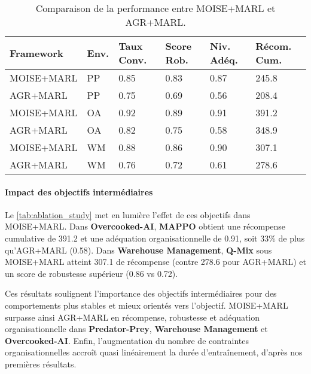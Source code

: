 \documentclass[francais,ROIA,Unicode,manuscript]{cedram}
\begin{document}
\begin{table}[h!]
    \centering
    \caption{Comparaison de la performance entre MOISE+MARL et AGR+MARL.}
    \label{tab:ablation_study}
    \footnotesize
    \renewcommand{\arraystretch}{1.1}
    \begin{tabular}{p{2.1cm}p{0.5cm}p{0.7cm}p{0.7cm}p{0.6cm}p{0.9cm}}
        \hline
        \textbf{Framework} & \textbf{Env.} & \textbf{Taux Conv.} & \textbf{Score Rob.} & \textbf{Niv. Adéq.} & \textbf{Récom. Cum.} \\ \hline
        MOISE+MARL         & PP            & 0.85                & 0.83                & 0.87                & 245.8                \\
        AGR+MARL           & PP            & 0.75                & 0.69                & 0.56                & 208.4                \\
        MOISE+MARL         & OA            & 0.92                & 0.89                & 0.91                & 391.2                \\
        AGR+MARL           & OA            & 0.82                & 0.75                & 0.58                & 348.9                \\
        MOISE+MARL         & WM            & 0.88                & 0.86                & 0.90                & 307.1                \\
        AGR+MARL           & WM            & 0.76                & 0.72                & 0.61                & 278.6                \\ \hline
    \end{tabular}
\end{table}

\paragraph{Impact des objectifs intermédiaires}
Le \autoref{tab:ablation_study} met en lumière l’effet de ces objectifs dans MOISE+MARL. Dans \textbf{Overcooked-AI}, \textbf{MAPPO} obtient une récompense cumulative de 391.2 et une adéquation organisationnelle de 0.91, soit 33\% de plus qu’AGR+MARL (0.58). Dans \textbf{Warehouse Management}, \textbf{Q-Mix} sous MOISE+MARL atteint 307.1 de récompense (contre 278.6 pour AGR+MARL) et un score de robustesse supérieur (0.86 vs 0.72).

Ces résultats soulignent l’importance des objectifs intermédiaires pour des comportements plus stables et mieux orientés vers l’objectif. MOISE+MARL surpasse ainsi AGR+MARL en récompense, robustesse et adéquation organisationnelle dans \textbf{Predator-Prey}, \textbf{Warehouse Management} et \textbf{Overcooked-AI}.
%
Enfin, l’augmentation du nombre de contraintes organisationnelles accroît quasi linéairement la durée d’entraînement, d’après nos premières résultats\footnotemark[2].
\end{document}
